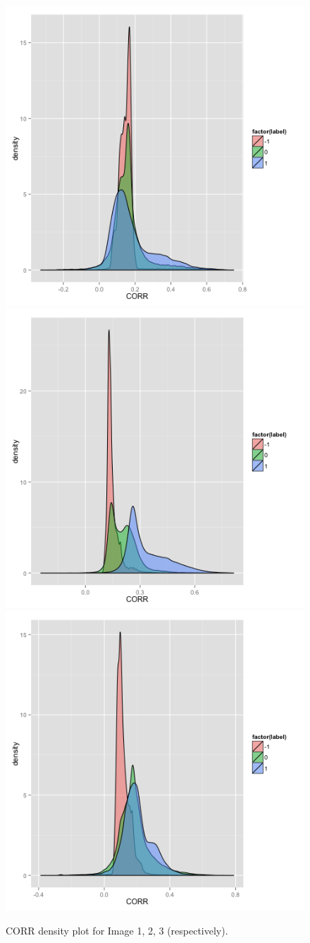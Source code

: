 \documentclass{article}\usepackage[]{graphicx}\usepackage[]{color}
\begin{document}
\begin{figure}[H]
  \includegraphics[width=\linewidth, height = 100pts]{CORR1.png}
\endminipage\hfill
\vspace{-5mm}
  \includegraphics[width=\linewidth, height = 100pts]{CORR2.png}
\endminipage\hfill
{}%
  \includegraphics[width=\linewidth, height = 100pts]{CORR3.png}
\endminipage
  \caption{CORR density plot for Image 1, 2, 3 (respectively).}\label{}
\end{figure}
\end{document}
